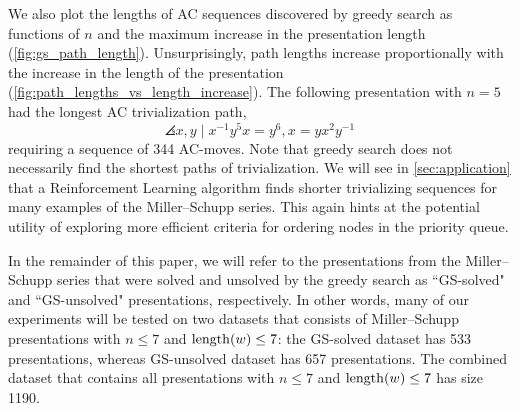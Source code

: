 We also plot the lengths of AC sequences discovered by greedy search as functions of $n$ and the maximum increase in the presentation length (\autoref{fig:gs_path_length}).
Unsurprisingly, path lengths increase proportionally with the increase in the length of the presentation (\autoref{fig:path_lengths_vs_length_increase}).
The following presentation with $n=5$ had the longest AC trivialization path,
\[
\angles{x, y \mid x^{-1} y^5 x = y^6,  x = y x^2 y^{-1}}
\] %
requiring a sequence of 344 AC-moves.
Note that greedy search does not necessarily find the shortest paths of trivialization.
We will see in \autoref{sec:application} that a Reinforcement Learning algorithm finds shorter trivializing sequences for many examples of the Miller--Schupp series.
This again hints at the potential utility of exploring more efficient criteria for ordering nodes in the priority queue.

In the remainder of this paper, we will refer to the presentations from the Miller--Schupp series that were solved and unsolved by the greedy search as ``GS-solved" and ``GS-unsolved" presentations, respectively. In other words, many of our experiments will be tested on two datasets that consists of Miller--Schupp presentations with $n \leq 7$ and $\operatorname{length}(w) \leq 7$: the GS-solved dataset has 533 presentations, whereas GS-unsolved dataset has 657 presentations. The combined dataset that contains all presentations with $n \leq 7$ and $\operatorname{length}(w) \leq 7$ has size 1190.

